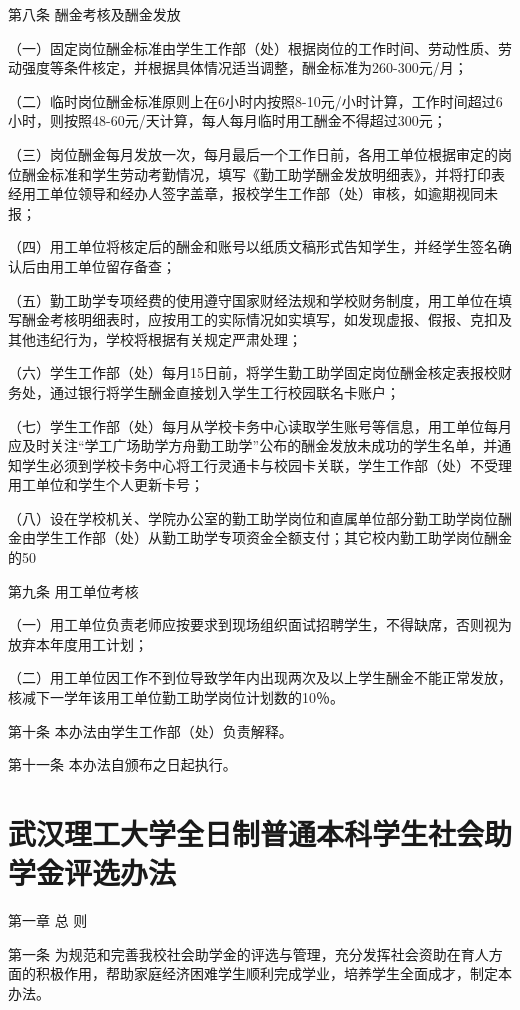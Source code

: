 \documentclass[UTF8,12pt,a4paper]{report}
\begin{document}
第八条 酬金考核及酬金发放

（一）固定岗位酬金标准由学生工作部（处）根据岗位的工作时间、劳动性质、劳动强度等条件核定，并根据具体情况适当调整，酬金标准为260-300元/月；

（二）临时岗位酬金标准原则上在6小时内按照8-10元/小时计算，工作时间超过6小时，则按照48-60元/天计算，每人每月临时用工酬金不得超过300元；

（三）岗位酬金每月发放一次，每月最后一个工作日前，各用工单位根据审定的岗位酬金标准和学生劳动考勤情况，填写《勤工助学酬金发放明细表》，并将打印表经用工单位领导和经办人签字盖章，报校学生工作部（处）审核，如逾期视同未报；

（四）用工单位将核定后的酬金和账号以纸质文稿形式告知学生，并经学生签名确认后由用工单位留存备查；

（五）勤工助学专项经费的使用遵守国家财经法规和学校财务制度，用工单位在填写酬金考核明细表时，应按用工的实际情况如实填写，如发现虚报、假报、克扣及其他违纪行为，学校将根据有关规定严肃处理；

（六）学生工作部（处）每月15日前，将学生勤工助学固定岗位酬金核定表报校财务处，通过银行将学生酬金直接划入学生工行校园联名卡账户；

（七）学生工作部（处）每月从学校卡务中心读取学生账号等信息，用工单位每月应及时关注“学工广场助学方舟勤工助学”公布的酬金发放未成功的学生名单，并通知学生必须到学校卡务中心将工行灵通卡与校园卡关联，学生工作部（处）不受理用工单位和学生个人更新卡号；

（八）设在学校机关、学院办公室的勤工助学岗位和直属单位部分勤工助学岗位酬金由学生工作部（处）从勤工助学专项资金全额支付；其它校内勤工助学岗位酬金的50%

第九条 用工单位考核

（一）用工单位负责老师应按要求到现场组织面试招聘学生，不得缺席，否则视为放弃本年度用工计划；

（二）用工单位因工作不到位导致学年内出现两次及以上学生酬金不能正常发放，核减下一学年该用工单位勤工助学岗位计划数的10％。

第十条 本办法由学生工作部（处）负责解释。

第十一条 本办法自颁布之日起执行。

\chapter{武汉理工大学全日制普通本科学生社会助学金评选办法}
第一章 总 则

第一条 为规范和完善我校社会助学金的评选与管理，充分发挥社会资助在育人方面的积极作用，帮助家庭经济困难学生顺利完成学业，培养学生全面成才，制定本办法。
\end{document}
